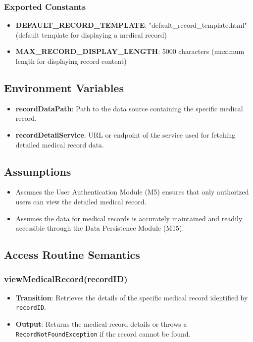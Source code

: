 \documentclass[12pt, titlepage]{article}
\begin{document}
\subsubsection{Exported Constants}
\begin{itemize}
\item \textbf{DEFAULT\_RECORD\_TEMPLATE}: "default\_record\_template.html" (default template for displaying a medical record)
\item \textbf{MAX\_RECORD\_DISPLAY\_LENGTH}: 5000 characters (maximum length for displaying record content)
\end{itemize}

\subsection{Environment Variables}
\begin{itemize}
\item \textbf{recordDataPath}: Path to the data source containing the specific medical record.
\item \textbf{recordDetailService}: URL or endpoint of the service used for fetching detailed medical record data.
\end{itemize}

\subsection{Assumptions}
\begin{itemize}
    \item Assumes the User Authentication Module (M5) ensures that only authorized users can view the detailed medical record.
    \item Assumes the data for medical records is accurately maintained and readily accessible through the Data Persistence Module (M15).
\end{itemize}


\subsection{Access Routine Semantics}
\subsubsection{viewMedicalRecord(recordID)}
\begin{itemize}
    \item \textbf{Transition}: Retrieves the details of the specific medical record identified by \texttt{recordID}.
    \item \textbf{Output}: Returns the medical record details or throws a \texttt{RecordNotFoundException} if the record cannot be found.
\end{itemize}
\end{document}
